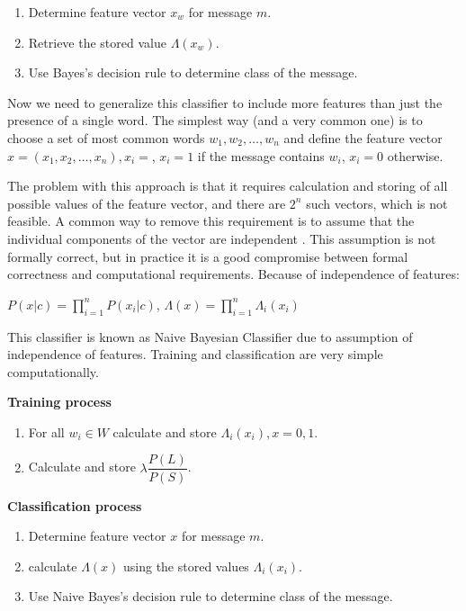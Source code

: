 \documentclass[12pt]{report}
\begin{document}
\begin{enumerate}
	\item Determine feature vector $x_w$ for message $m$.
	\item Retrieve the stored value $\Lambda(x_w)$.
	\item Use Bayes's decision rule to determine class of the message.
\end{enumerate}

Now we need to generalize this classifier to include more features than just the presence of a single word. The simplest way (and a very common one) is to choose a set of most common words $w_1, w_2, \dots, w_n$ and define the feature vector $x = (x_1, x_2, \dots, x_n), x_i = $, $x_i = 1$ if the message contains $w_i$, $x_i = 0$ otherwise.

The problem with this approach is that it requires calculation and storing of all possible values of the feature vector, and there are $2^n$ such vectors, which is not feasible. A common way to remove this requirement is to assume that the individual components of the vector are independent \cite{Tretyakov}. This assumption is not formally correct, but in practice it is a good compromise between formal correctness and computational requirements. Because of independence of features:

\begin{center}
	$P(x | c) = \prod_{i=1}^{n}P(x_i | c)$, $\Lambda(x) = \prod_{i=1}^{n}\Lambda_i(x_i)$
\end{center}

This classifier is known as Naive Bayesian Classifier due to assumption of independence of features. Training and classification are very simple computationally.

\textbf{Training process}

\begin{enumerate}
	\item For all $w_i \in W$ calculate and store $\Lambda_i(x_i), x = 0, 1$.
	\item Calculate and store $\lambda \dfrac{P(L)}{P(S)}$.
\end{enumerate}

\textbf{Classification process}

\begin{enumerate}
	\item Determine feature vector $x$ for message $m$.
	\item calculate $\Lambda(x)$ using the stored values $\Lambda_i(x_i)$.
	\item Use Naive Bayes's decision rule to determine class of the message.
\end{enumerate}
\end{document}
